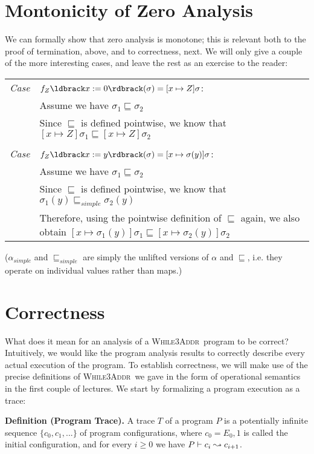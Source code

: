 \documentclass[11pt]{article}
\newcommand{\definition}[2]
  {\bigskip \noindent
   \textbf{Definition (#1).}  #2
   \bigskip
  }
\newcommand{\parg}[1] %
  {\ldbrack #1 \rdbrack}
\def\WhileThAddr{\textsc{While3Addr}}
\newcommand{\alap}{\sqsubseteq}
\begin{document}
\section{Montonicity of Zero Analysis}


We can formally show that zero analysis is monotone; this is relevant both to the proof of termination, above, and to correctness, next.  We will only give a couple of the more interesting cases, and leave the rest as an exercise to the reader:

\begin{tabularx}{\textwidth}{lX}
\emph{Case}  & $f_Z\parg{x := 0}(\sigma) = [x \mapsto Z]\sigma$: \\
 & Assume we have $\sigma_1 \alap \sigma_2$ \\
 & Since $\alap$ is defined pointwise, we know that $[x \mapsto Z]\sigma_1 \alap [x \mapsto Z]\sigma_2$\\
\\

\emph{Case} &  $f_Z\parg{x := y}(\sigma) = [x \mapsto \sigma(y)]\sigma$: \\
& Assume we have $\sigma_1 \alap \sigma_2$ \\
&  Since $\alap$ is defined pointwise, we know that $\sigma_1(y) \alap_\textit{simple} \sigma_2(y)$ \\
& Therefore, using the pointwise definition of $\alap$ again, we also obtain $[x \mapsto \sigma_1(y)]\sigma_1 \alap [x \mapsto \sigma_2(y)]\sigma_2$\\ 
\end{tabularx}

\noindent ($\alpha_\textit{simple}$ and $\alap_\textit{simple}$ are simply the unlifted versions of $\alpha$ and $\alap$, i.e. they operate on individual values rather than maps.)

\section{Correctness}

 What does it mean for an analysis of a \WhileThAddr\ program to be correct?  Intuitively, we would like the program analysis results to correctly describe every actual execution of the program.  To establish correctness, we will make use of the precise definitions of \WhileThAddr\ we gave in the form of operational semantics in the first couple of lectures. 
We start by formalizing a program execution as a trace:

\definition{Program Trace}{A trace $T$ of a program $P$ is a potentially infinite sequence $\{ c_0, c_1, ... \}$ of program configurations, where $c_0 = E_0, 1$ is called the initial configuration, and for every $i \ge 0$ we have $P \vdash c_i \leadsto c_{i+1}}$.
\end{document}
